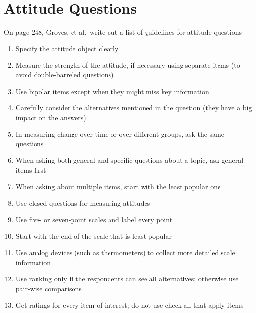 \documentclass[11pt]{homework}
\begin{document}
\clearpage 

\section{Attitude Questions}
On page 248, Groves, et al.\ write out a list of guidelines for attitude questions
\begin{enumerate}[noitemsep]
\item Specify the attitude object clearly
\item Measure the strength of the attitude, if necessary using separate items (to avoid double-barreled questions)
\item Use bipolar items except when they might miss key information
\item Carefully consider the alternatives mentioned in the question (they have a big impact on the answers)
\item In measuring change over time or over different groups, ask the same questions
\item When asking both general and specific questions about a topic, ask general items first
\item When asking about multiple items, start with the least popular one
\item Use closed questions for measuring attitudes
\item Use five- or seven-point scales and label every point
\item Start with the end of the scale that is least popular
\item Use analog devices (such as thermometers) to collect more detailed scale information
\item Use ranking only if the respondents can see all alternatives; otherwise use pair-wise comparisons
\item Get ratings for every item of interest; do not use check-all-that-apply items
\end{enumerate}
\end{document}
